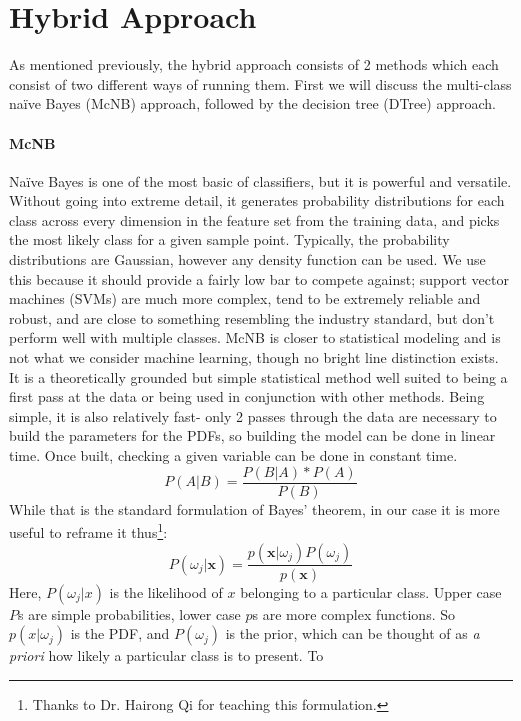 \section{Hybrid Approach}
As mentioned previously, the hybrid approach consists of 2 methods which each
consist of two different ways of running them.  First we will discuss the
multi-class na\"ive Bayes (McNB) approach, followed by the decision tree (DTree)
approach.
\paragraph{McNB}
Na\"ive Bayes is one of the most basic of classifiers, but it is powerful and
versatile.  Without going into extreme detail, it generates probability
distributions for each class across every dimension in the feature set from the
training data, and picks the most likely class for a given sample point. 
Typically, the probability distributions are Gaussian, however any density
function can be used.   We use this because it should provide a fairly low bar
to compete against; support vector machines (SVMs) are much more complex, tend to
be extremely reliable and robust, and are close to something resembling the
industry standard, but don't perform well with multiple classes.  McNB is closer
to statistical modeling and is not what we consider machine learning, though no
bright line distinction exists.  It is a theoretically grounded but simple
statistical method well suited to being a first pass at the data or being used
in conjunction with other methods.  Being simple, it is also relatively fast-
only 2 passes through the data are necessary to build the parameters for the
PDFs, so building the model can be done in linear time.  Once built, checking a
given variable can be done in constant time.
\begin{equation}
P(A|B) = \frac{P(B|A)*P(A)}{P(B)}
\end{equation}
While that is the standard formulation of Bayes' theorem, in our case it is more useful to reframe it thus\footnote{Thanks to Dr. Hairong Qi for teaching this formulation.}:
\begin{equation}
P(\omega_j|\textbf{x}) = \frac{p(\textbf{x}|\omega_j)P(\omega_j)}{p(\textbf{x})}
\label{eq:bayes}
\end{equation}
Here, $P(\omega_j|x)$ is the likelihood of $x$ belonging to a particular class.  Upper
case $P$s are simple probabilities, lower case $p$s are more complex functions.
So $p(x|\omega_j)$ is the PDF, and $P(\omega_j)$ is the prior, which can be
thought of as \textit{a priori} how likely a particular class is to present.  To
